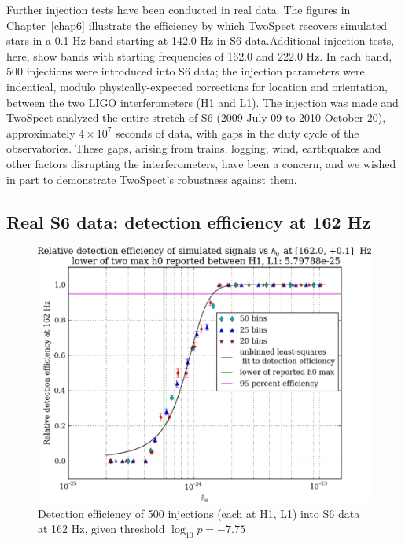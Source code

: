 
Further injection tests have been conducted in real data.
The figures in Chapter~\ref{chap6} illustrate the efficiency by which TwoSpect recovers simulated stars in a 0.1 Hz band starting at 142.0 Hz in S6 data.Additional injection tests, here, show bands with starting frequencies of 162.0 and 222.0 Hz.
In each band, 500 injections were introduced into S6 data; the injection parameters were indentical, modulo physically-expected corrections for location and orientation, between the two LIGO interferometers (H1 and L1).
The injection was made and TwoSpect analyzed the entire stretch of S6 (2009 July 09 to 2010 October 20), approximately $4 \times 10^7$ seconds of data, with gaps in the duty cycle of the observatories.
These gaps, arising from trains, logging, wind, earthquakes and other factors disrupting the interferometers, have been a concern, and we wished in part to demonstrate TwoSpect's robustness against them.


\subsection{Real S6 data: detection efficiency at 162 Hz}

\begin{figure}
\begin{center}
\includegraphics[width=0.70\paperwidth,height=0.48\paperheight]{plots/detectionEfficiencyh0-162-0Hz.eps}
\caption{
Detection efficiency of 500 injections (each at H1, L1) into
S6 data at 162 Hz, given threshold $\log_{10}p = -7.75$}
\label{S6_det_eff_162}
\end{center}
\end{figure}


